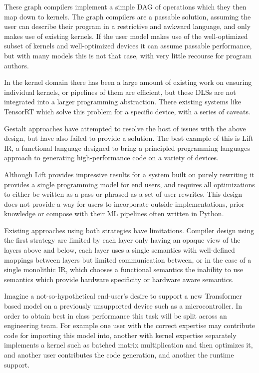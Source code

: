 These graph compilers implement a simple DAG of operations which they then map down to kernels. The graph compilers are a passable solution, assuming the user can describe their program in a restrictive and awkward language, and only makes use of existing kernels. If the user model makes use of the well-optimized subset of kernels and well-optimized devices it can assume passable performance, but with many models this is not that case, with very little recourse for program authors.

In the kernel domain there has been a large amount of existing work on ensuring individual kernels, or pipelines of them are efficient, but these DLSs are not integrated into a larger programming abstraction. There existing systems like TensorRT which solve this problem for a specific device, with a series of caveats.

Gestalt approaches have attempted to resolve the host of issues with the above design, but have also failed to provide a solution. The best example of this is Lift IR, a functional language designed to bring a principled programming languages approach to generating high-performance code on a variety of devices.

Although Lift provides impressive results for a system built on purely rewriting it provides a single programming model for end users, and requires all optimizations to either be written as a pass or phrased as a set of user rewrites. This design does not provide a way for users to incorporate outside implementations, prior knowledge or compose with their ML pipelines often written in Python.

Existing approaches using both strategies have limitations. Compiler design using the first strategy are limited by each layer only having an opaque view of the layers above and below, each layer uses a single semantics with well-defined mappings between layers but limited communication between, or in the case of a single monolithic IR, which chooses a functional semantics the inability to use semantics which provide hardware specificity or hardware aware semantics.

Imagine a not-so-hypothetical end-user’s desire to support a new Transformer based model on a previously unsupported device such as a microcontroller. In order to obtain best in class performance this task will be split across an engineering team. For example one user with the correct expertise may contribute code for importing this model into,  another with kernel expertise separately implements a kernel such as batched matrix multiplication and then optimizes it, and another user contributes the code generation, and another the runtime support.

